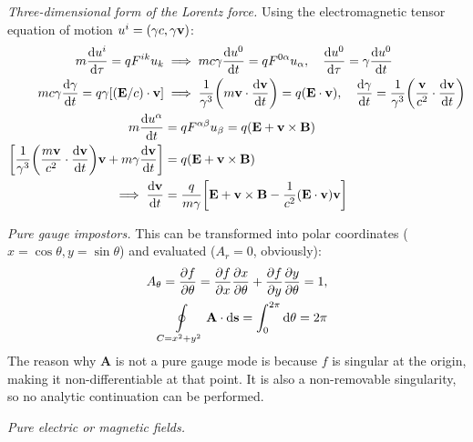 \documentclass{report}
\begin{document}
\begin{subquests}
	\item \emph{Three-dimensional form of the Lorentz force.}
	Using the electromagnetic tensor equation of motion $u^i = (\gamma c, \gamma \vb v)$:
	\begin{align*}
		m\dv{u^i}{\tau} = q F^{ik}u_k & \implies mc\gamma\dv{u^0}{t} = q F^{0\alpha}u_{\alpha}, \quad \dv{u^0}{\tau} = \gamma \dv{u^0}{t} \\
		mc\gamma\dv{\gamma}{t} = q\gamma\bqty{(\mathbf E/c) \cdot \mathbf v} & \implies \frac{1}{\gamma^3}\pqty{m\mathbf v\cdot\dv{\mathbf v}{t}} = q\pqty{\mathbf E \cdot \mathbf v}, \quad \dv{\gamma}{t} = \frac{1}{\gamma^3}\pqty{\frac{\vb v}{c^2}\cdot \dv{\vb v}{t}}  \\
		m\dv{u^{\alpha}}{t} & = q F^{\alpha\beta}u_{\beta} = q\pqty{\mathbf E + \mathbf v \times \mathbf B} \\
		\bqty{\frac{1}{\gamma^3}\pqty{\frac{m\mathbf v}{c^2}\cdot \dv{\mathbf v}{t}}\vb v + m\gamma \dv{\mathbf v}{t}} & = q\pqty{\mathbf E + \mathbf v \times \mathbf B} \\
		\implies \dv{\mathbf v}{t} & = \frac{q}{m\gamma}\bqty{\mathbf E + \mathbf v \times \mathbf B - \frac{1}{c^2}\pqty{\mathbf E \cdot \mathbf v}\mathbf v}
	\end{align*}

	\item \emph{Pure gauge impostors.}
	This can be transformed into polar coordinates ($x = \cos\theta, y = \sin\theta $) and evaluated ($A_r = 0$, obviously):
	\begin{align*}
		A_{\theta} = \pdv{f}{\theta} = \pdv{f}{x}\pdv{x}{\theta} + \pdv{f}{y}\pdv{y}{\theta} = 1,\\
		\oint\limits_{C = x^2 + y^2} \mathbf A \cdot \dd{\mathbf s} = \int_0^{2\pi}\dd{\theta} = 2\pi 
	\end{align*}
	The reason why $\mathbf A$ is not a pure gauge mode is because $f$ is singular at the origin, making it non-differentiable at that point. It is also a non-removable singularity, so no analytic continuation can be performed.

	\item \emph{Pure electric or magnetic fields.}


\end{subquests}
\end{document}
